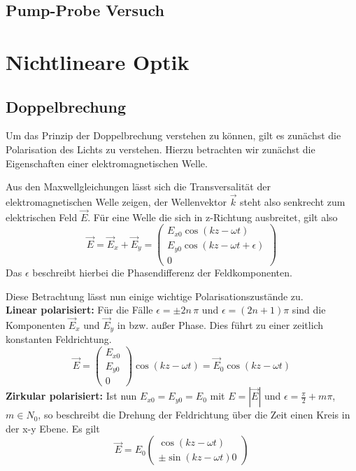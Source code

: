     \subsection{Pump-Probe Versuch}

\section{Nichtlineare Optik}
    \subsection{Doppelbrechung}

Um das Prinzip der Doppelbrechung verstehen zu können, gilt es zunächst die 
Polarisation des Lichts zu verstehen. Hierzu betrachten wir zunächst die 
Eigenschaften einer elektromagnetischen Welle.\par
Aus den Maxwellgleichungen lässt sich die Transversalität der elektromagnetischen
Welle zeigen, der Wellenvektor $\vec{k}$ steht also senkrecht zum elektrischen 
Feld $\vec{E}$. Für eine Welle die sich in z-Richtung ausbreitet, gilt also
\[
    \vec{E} = \vec{E}_x + \vec{E}_y = 
      \begin{pmatrix}
          E_{x0} \cos(kz-\omega t)\\
          E_{y0} \cos(kz-\omega t + \epsilon)\\
          0
      \end{pmatrix}
\]
Das $\epsilon$ beschreibt hierbei die Phasendifferenz der Feldkomponenten.

Diese Betrachtung lässt nun einige wichtige Polarisationszustände zu.\\
\textbf{Linear polarisiert:} Für die Fälle $\epsilon = \pm 2n \, \pi$ und
$\epsilon = (2n+1) \pi$ sind die Komponenten $\vec{E}_x$ und $\vec{E}_y$ in bzw.
außer Phase. Dies führt zu einer zeitlich konstanten Feldrichtung.
\[
    \vec{E} = 
      \begin{pmatrix}
          E_{x0}\\
          E_{y0}\\
          0
      \end{pmatrix}
    \cos (kz-\omega t) = \vec{E}_0 \cos (kz-\omega t)
\]
\textbf{Zirkular polarisiert:} Ist nun $E_{x0} = E_{y0} = E_0$ mit 
$E = | \vec{E} |$ und $\epsilon = \frac{\pi}{2} + m \pi$, $m \in N_0$, so beschreibt
die Drehung der Feldrichtung über die Zeit einen Kreis in der x-y Ebene. Es gilt
\[
    \vec{E} = E_0
        \begin{pmatrix}
            \cos(kz-\omega t)\\
            \pm \sin(kz-\omega t)
            0
        \end{pmatrix}
\]

